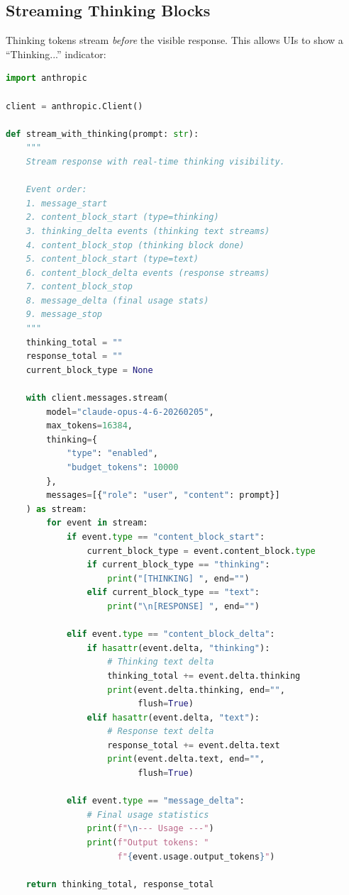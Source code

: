 \documentclass[11pt,a4paper]{article}
\begin{document}
\subsection{Streaming Thinking Blocks}

Thinking tokens stream \textit{before} the visible response. This allows UIs to show a ``Thinking...'' indicator:

\begin{lstlisting}[language=Python, caption={Streaming with Thinking Blocks}]
import anthropic

client = anthropic.Client()

def stream_with_thinking(prompt: str):
    """
    Stream response with real-time thinking visibility.
    
    Event order:
    1. message_start
    2. content_block_start (type=thinking)
    3. thinking_delta events (thinking text streams)
    4. content_block_stop (thinking block done)
    5. content_block_start (type=text)
    6. content_block_delta events (response streams)
    7. content_block_stop
    8. message_delta (final usage stats)
    9. message_stop
    """
    thinking_total = ""
    response_total = ""
    current_block_type = None
    
    with client.messages.stream(
        model="claude-opus-4-6-20260205",
        max_tokens=16384,
        thinking={
            "type": "enabled",
            "budget_tokens": 10000
        },
        messages=[{"role": "user", "content": prompt}]
    ) as stream:
        for event in stream:
            if event.type == "content_block_start":
                current_block_type = event.content_block.type
                if current_block_type == "thinking":
                    print("[THINKING] ", end="")
                elif current_block_type == "text":
                    print("\n[RESPONSE] ", end="")
            
            elif event.type == "content_block_delta":
                if hasattr(event.delta, "thinking"):
                    # Thinking text delta
                    thinking_total += event.delta.thinking
                    print(event.delta.thinking, end="",
                          flush=True)
                elif hasattr(event.delta, "text"):
                    # Response text delta
                    response_total += event.delta.text
                    print(event.delta.text, end="",
                          flush=True)
            
            elif event.type == "message_delta":
                # Final usage statistics
                print(f"\n--- Usage ---")
                print(f"Output tokens: "
                      f"{event.usage.output_tokens}")
    
    return thinking_total, response_total
\end{lstlisting}
\end{document}
